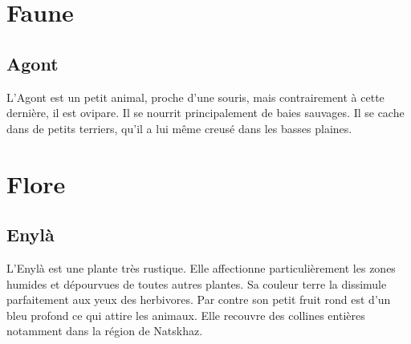 \section{Faune}
\subsection{Agont}
L'Agont est un petit animal, proche d'une souris, mais contrairement à cette dernière, il est ovipare.
Il se nourrit principalement de baies sauvages.
Il se cache dans de petits terriers, qu'il a lui même creusé dans les basses plaines.  
\section{Flore}
\subsection{Enylà}
L'Enylà est une plante très rustique.
Elle affectionne particulièrement les zones humides et dépourvues de toutes autres plantes.
Sa couleur terre la dissimule parfaitement aux yeux des herbivores.
Par contre son petit fruit rond est d'un bleu profond ce qui attire les animaux.
Elle recouvre des collines entières notamment dans la région de Natskhaz.
